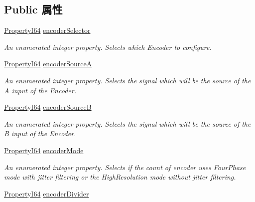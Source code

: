 \subsection*{Public 属性}
\begin{DoxyCompactItemize}
\item 
\hyperlink{group___common_interface_ga81749b2696755513663492664a18a893}{Property\+I64} \hyperlink{classmv_i_m_p_a_c_t_1_1acquire_1_1_gen_i_cam_1_1_encoder_control_a1a1395b78f2907c71bce8f511e38a123}{encoder\+Selector}
\begin{DoxyCompactList}\small\item\em An enumerated integer property. Selects which Encoder to configure. \end{DoxyCompactList}\item 
\hyperlink{group___common_interface_ga81749b2696755513663492664a18a893}{Property\+I64} \hyperlink{classmv_i_m_p_a_c_t_1_1acquire_1_1_gen_i_cam_1_1_encoder_control_a10c9b2deca4c4db3e72b43747cb1a6ef}{encoder\+Source\+A}
\begin{DoxyCompactList}\small\item\em An enumerated integer property. Selects the signal which will be the source of the A input of the Encoder. \end{DoxyCompactList}\item 
\hyperlink{group___common_interface_ga81749b2696755513663492664a18a893}{Property\+I64} \hyperlink{classmv_i_m_p_a_c_t_1_1acquire_1_1_gen_i_cam_1_1_encoder_control_a05d60aa41efeeecd3682c8f3ffc01cd6}{encoder\+Source\+B}
\begin{DoxyCompactList}\small\item\em An enumerated integer property. Selects the signal which will be the source of the B input of the Encoder. \end{DoxyCompactList}\item 
\hyperlink{group___common_interface_ga81749b2696755513663492664a18a893}{Property\+I64} \hyperlink{classmv_i_m_p_a_c_t_1_1acquire_1_1_gen_i_cam_1_1_encoder_control_a6825f0b4f99463f39de11401c67fb67e}{encoder\+Mode}
\begin{DoxyCompactList}\small\item\em An enumerated integer property. Selects if the count of encoder uses Four\+Phase mode with jitter filtering or the High\+Resolution mode without jitter filtering. \end{DoxyCompactList}\item 
\hyperlink{group___common_interface_ga81749b2696755513663492664a18a893}{Property\+I64} \hyperlink{classmv_i_m_p_a_c_t_1_1acquire_1_1_gen_i_cam_1_1_encoder_control_aad764e7913eb8f8ce1b8ba247a17b34a}{encoder\+Divider}

\end{DoxyCompactItemize}
